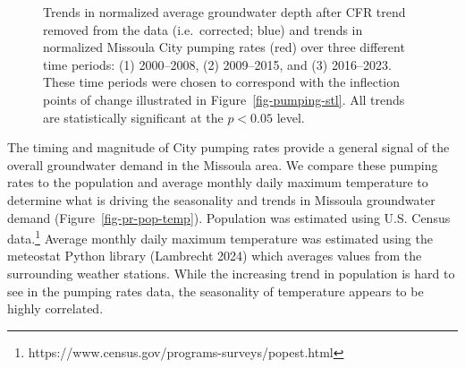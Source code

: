 \documentclass[
  letterpaper,
  DIV=11,
  numbers=noendperiod]{scrartcl}
\begin{document}
\begin{figure}


\caption{\label{fig-gw-pr-trends}Trends in normalized average
groundwater depth after CFR trend removed from the data (i.e.~corrected;
blue) and trends in normalized Missoula City pumping rates (red) over
three different time periods: (1) 2000--2008, (2) 2009--2015, and (3)
2016--2023. These time periods were chosen to correspond with the
inflection points of change illustrated in Figure~\ref{fig-pumping-stl}.
All trends are statistically significant at the \(p<0.05\) level.}

\end{figure}%

The timing and magnitude of City pumping rates provide a general signal
of the overall groundwater demand in the Missoula area. We compare these
pumping rates to the population and average monthly daily maximum
temperature to determine what is driving the seasonality and trends in
Missoula groundwater demand (Figure~\ref{fig-pr-pop-temp}). Population
was estimated using U.S. Census data.\footnote{https://www.census.gov/programs-surveys/popest.html}
Average monthly daily maximum temperature was estimated using the
meteostat Python library (Lambrecht 2024) which averages values from the
surrounding weather stations. While the increasing trend in population
is hard to see in the pumping rates data, the seasonality of temperature
appears to be highly correlated.
\end{document}
